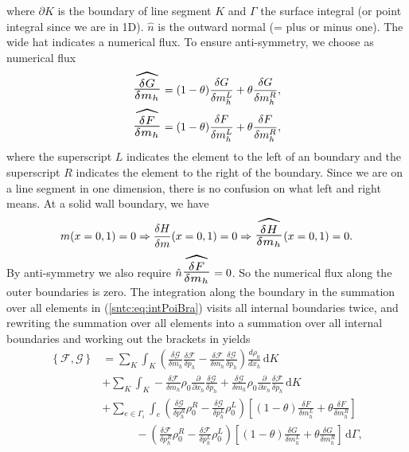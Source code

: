 \documentclass{article}
\begin{document}
where $\partial K$ is the boundary of line segment $K$ and $\Gamma$ the surface integral (or point integral since we are in 1D). $\hat{n}$ is the outward normal (= plus or minus one). The wide hat indicates a numerical flux. To ensure anti-symmetry, we choose as numerical flux
\begin{equation}
	\begin{aligned}
		\scalebox{2}{$\widehat{\scalebox{0.725}{$\frac{\delta G}{\delta m_h}$}}$} = (1-\theta) \frac{\delta G}{\delta m_h^L} + \theta \frac{\delta G}{\delta m_h^R}, \\
		\scalebox{2}{$\widehat{\scalebox{0.725}{$\frac{\delta F}{\delta m_h}$}}$} = (1-\theta) \frac{\delta F}{\delta m_h^L} + \theta \frac{\delta F}{\delta m_h^R}, 
	\end{aligned}
\end{equation}
where the superscript $L$ indicates the element to the left of an boundary and the superscript $R$ indicates the element to the right of the boundary. Since we are on a line segment in one dimension, there is no confusion on what left and right means. At a solid wall boundary, we have
\begin{equation}
	m (x=0,1) = 0 \Rightarrow \frac{\delta H}{\delta m}(x=0,1) = 0 \Rightarrow \scalebox{2}{$\widehat{\scalebox{0.725}{$\frac{\delta H}{\delta m_h}$}}$}(x=0,1) = 0.
\end{equation}
By anti-symmetry we also require $\hat{n} \scalebox{2}{$\widehat{\scalebox{0.725}{$\frac{\delta F}{\delta m_h}$}}$} = 0$. So the numerical flux along the outer boundaries is zero. The integration along the boundary in the summation over all elements in (\ref{sntc:eq:intPoiBra}) visits all internal boundaries twice, and rewriting the summation over all elements into a summation over all internal boundaries and working out the brackets in yields
\begin{equation}
	\label{sntc:eq:ibtPoiBra}
	\begin{aligned}
\left\{\mathcal{F}, \mathcal{G}\right\} &= \sum_K \int_K \! \left(\frac{\delta \mathcal{G}}{\delta m_h}\frac{\delta \mathcal{F}}{\delta p_h} - \frac{\delta \mathcal{F}}{\delta m_h}  \frac{\delta \mathcal{G}}{\delta p_h} \right) \frac{d \rho_0}{d x_h}   \, \mathrm{d}K \\
&+ \sum_K \int_K \! - \frac{\delta \mathcal{F}}{\delta m_h} \rho_0  \frac{\partial}{\partial x_h} \frac{\delta \mathcal{G}}{\delta p_h} + \frac{\delta \mathcal{G}}{\delta m_h} \rho_0 \frac{\partial}{\partial x_h} \frac{\delta \mathcal{F}}{\delta p_h}  \, \mathrm{d}K \\
&+ \sum_{e \in \Gamma_i} \int_{e} \! \left(\frac{\delta \mathcal{G}}{\delta p_h^R} \rho_0^R - \frac{\delta \mathcal{G}}{\delta p_h^L} \rho_0^L \right) \left[  (1-\theta) \frac{\delta F}{\delta m_h^L} + \theta \frac{\delta F}{\delta m_h^R}\right] \\
& \quad \qquad - \left(\frac{\delta \mathcal{F}}{\delta p_h^R} \rho_0^R - \frac{\delta \mathcal{F}}{\delta p_h^L} \rho_0^L \right) \left[  (1-\theta) \frac{\delta G}{\delta m_h^L} + \theta \frac{\delta G}{\delta m_h^R}\right] \, \mathrm{d}\Gamma,
	\end{aligned}
\end{equation}	
\end{document}
